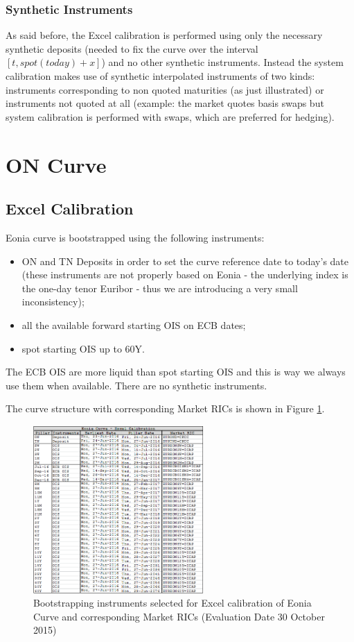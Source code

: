\subsubsection{Synthetic Instruments}
As said before, the Excel calibration is performed using only the necessary synthetic deposits (needed to fix the curve over the interval $[t,spot(today)+x]$) and no other synthetic instruments. Instead the system calibration makes use of synthetic interpolated instruments of two kinds: instruments corresponding to non quoted maturities (as just illustrated) or instruments not quoted at all (example: the market quotes basis swaps but system calibration is performed with swaps, which are preferred for hedging).  

\section{ON Curve}

\subsection{Excel Calibration}

Eonia curve is bootstrapped using the following instruments:
\begin{itemize}
\item ON and TN Deposits in order to set the curve reference date to today's date (these instruments are not properly based on Eonia - the underlying index is the one-day tenor Euribor - thus we are introducing a very small inconsistency);
\item all the available forward starting OIS on ECB dates;
\item spot starting OIS up to 60Y.
\end{itemize}
The ECB OIS are more liquid than spot starting OIS and this is way we always use them when available. There are no synthetic instruments.

The curve structure with corresponding Market RICs is shown in Figure \ref{fig:ONExcel}.

\begin{figure}
\centering
\includegraphics[width=0.58\textwidth]{images/ONExcel.png}
\caption{Bootstrapping instruments selected for Excel calibration of Eonia Curve and corresponding Market RICs (Evaluation Date 30 October 2015)}
\label{fig:ONExcel}
\end{figure}


